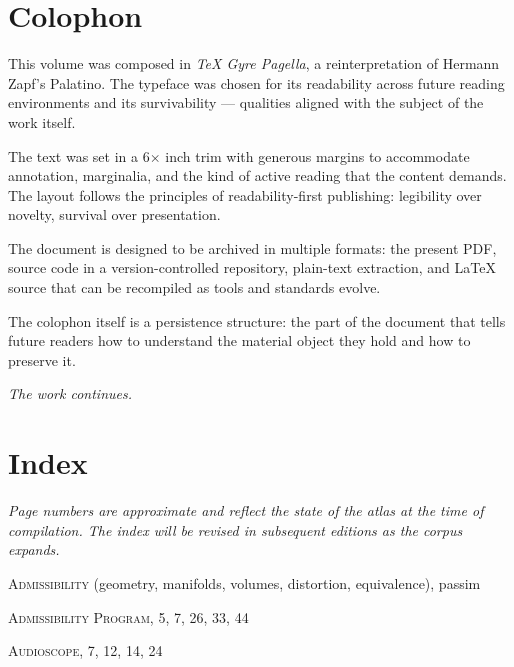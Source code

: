 \documentclass[12pt, openany]{book}
\begin{document}
\chapter*{Colophon}

\noindent This volume was composed in \textit{TeX Gyre Pagella}, a
reinterpretation of Hermann Zapf's Palatino. The typeface was chosen for
its readability across future reading environments and its
survivability — qualities aligned with the subject of the work itself.

\medskip

\noindent The text was set in a 6\thinspace$\times$ inch trim
with generous margins to accommodate annotation, marginalia, and the kind
of active reading that the content demands. The layout follows the
principles of readability-first publishing: legibility over novelty,
survival over presentation.

\medskip

\noindent The document is designed to be archived in multiple formats:
the present PDF, source code in a version-controlled repository,
plain-text extraction, and \LaTeX{} source that can be recompiled as
tools and standards evolve.

\medskip

\noindent The colophon itself is a persistence structure: the part of the
document that tells future readers how to understand the material object
they hold and how to preserve it.

\medskip

\noindent\textit{The work continues.}

\cleardoublepage

\chapter*{Index}

\noindent\textit{Page numbers are approximate and reflect the state of the
atlas at the time of compilation. The index will be revised in subsequent
editions as the corpus expands.}

\bigskip

\noindent\textsc{Admissibility} (geometry, manifolds, volumes, distortion,
equivalence), passim

\medskip
\noindent\textsc{Admissibility Program}, 5, 7, 26, 33, 44

\medskip
\noindent\textsc{Audioscope}, 7, 12, 14, 24
\end{document}
